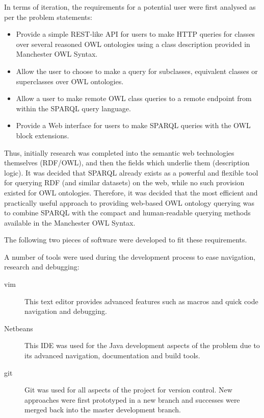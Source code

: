 \documentclass{article}
\begin{document}
In terms of iteration, the requirements for a potential user were first analysed 
as per the problem statements:

\begin{itemize}
    \item Provide a simple REST-like API for users to make HTTP queries for
    classes over several reasoned OWL ontologies using a class description
    provided in Manchester OWL Syntax.
    \item Allow the user to choose to make a query for subclasses, equivalent
    classes or superclasses over OWL ontologies.
    \item Allow a user to make remote OWL class queries to a remote endpoint from 
    within the SPARQL query language.
    \item Provide a Web interface for users to make SPARQL queries with the OWL
    block extensions.
\end{itemize}

Thus, initially research was completed into the semantic web technologies
themselves (RDF/OWL), and then the fields which underlie them (description
logic). It was decided that SPARQL already exists as a powerful and flexible
tool for querying RDF (and similar datasets) on the web, while no such provision
existed for OWL ontologies. Therefore, it was decided that the most efficient
and practically useful approach to providing web-based OWL ontology querying was
to combine SPARQL with the compact and human-readable querying methods available
in the Manchester OWL Syntax. 

The following two pieces of software were developed to fit these requirements.

A number of tools were used during the development process to ease navigation,
research and debugging:

\begin{description}
    \item[vim] This text editor provides advanced features such as macros and
    quick code navigation and debugging.
    \item[Netbeans] This IDE was used for the Java development aspects of the
    problem due to its advanced navigation, documentation and build tools.
    \item[git] Git was used for all aspects of the project for version control.
    New approaches were first prototyped in a new branch and successes were
    merged back into the master development branch.
\end{description}
\end{document}
